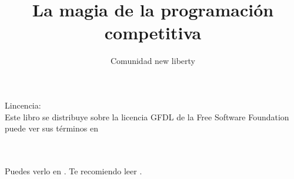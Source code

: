 \documentclass[11pt,a4paper]{book}
\author{Comunidad new liberty}
\title{La magia de la programación competitiva}
\begin{document}


\maketitle
\tableofcontents
\cleardoublepage
{}
\listoffigures
\cleardoublepage
{}
\listoftables
\cleardoublepage

\noindent Lincencia:\\

Este libro se distribuye sobre la licencia GFDL de la Free Software Foundation puede ver sus términos en \cite{GFDL:Online}






~\\
~\\
Puedes verlo en \cite{Patricio2011}. Te recomiendo leer \cite{Patricio2011, Zacarias2009, Alfonso2010b, Alfonso2010a}.
\cleardoublepage
{}

\end{document}
